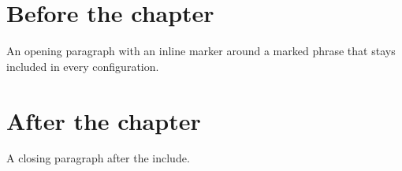 \section{Before the chapter}

An opening paragraph with an inline marker around
a marked phrase
that stays included in every configuration.



\section{After the chapter}

A closing paragraph after the include.
